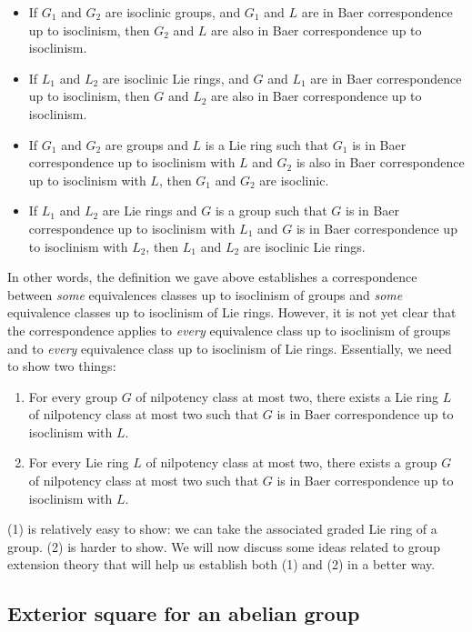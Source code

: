 \documentclass{ucetd}
\begin{document}
\begin{itemize}
\item If $G_1$ and $G_2$ are isoclinic groups, and $G_1$ and $L$ are
  in Baer correspondence up to isoclinism, then $G_2$ and $L$ are also
  in Baer correspondence up to isoclinism.
\item If $L_1$ and $L_2$ are isoclinic Lie rings, and $G$ and $L_1$
  are in Baer correspondence up to isoclinism, then $G$ and $L_2$ are
  also in Baer correspondence up to isoclinism.
\item If $G_1$ and $G_2$ are groups and $L$ is a Lie ring such that
  $G_1$ is in Baer correspondence up to isoclinism with $L$ and $G_2$
  is also in Baer correspondence up to isoclinism with $L$, then $G_1$
  and $G_2$ are isoclinic.
\item If $L_1$ and $L_2$ are Lie rings and $G$ is a group such that
  $G$ is in Baer correspondence up to isoclinism with $L_1$ and $G$ is
  in Baer correspondence up to isoclinism with $L_2$, then $L_1$ and
  $L_2$ are isoclinic Lie rings.
\end{itemize}


In other words, the definition we gave above establishes a
correspondence between {\em some} equivalences classes up to
isoclinism of groups and {\em some} equivalence classes up to
isoclinism of Lie rings. However, it is not yet clear that the
correspondence applies to {\em every} equivalence class up to
isoclinism of groups and to {\em every} equivalence class up to
isoclinism of Lie rings. Essentially, we need to show two things:

\begin{enumerate}
\item For every group $G$ of nilpotency class at most two, there
  exists a Lie ring $L$ of nilpotency class at most two such that $G$
  is in Baer correspondence up to isoclinism with $L$.
\item For every Lie ring $L$ of nilpotency class at most two, there
  exists a group $G$ of nilpotency class at most two such that $G$ is
  in Baer correspondence up to isoclinism with $L$.
\end{enumerate}

(1) is relatively easy to show: we can take the associated graded Lie
ring of a group. (2) is harder to show. We will now discuss some ideas
related to group extension theory that will help us establish both (1)
and (2) in a better way.

\subsection{Exterior square for an abelian group}\label{sec:exteriorsquare-abelian-group-proofs}
\end{document}

